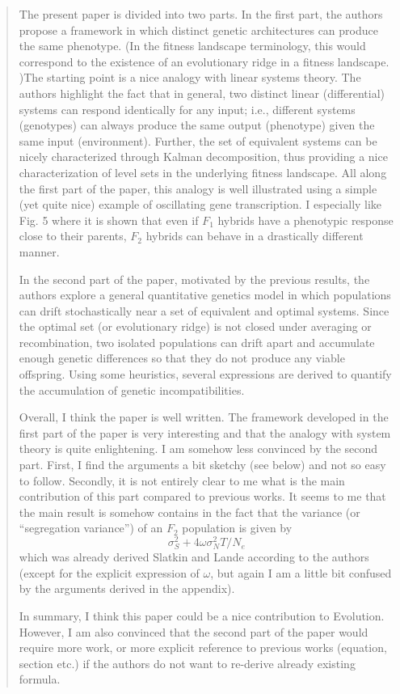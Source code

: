 


\begin{quote}
The present paper is divided into two parts. In the first part, the authors propose a framework
in which distinct genetic architectures can produce the same phenotype. (In the fitness landscape
terminology, this would correspond to the existence of an evolutionary ridge in a fitness landscape.
)The starting point is a nice analogy with linear systems theory. The authors highlight the fact
that in general, two distinct linear (differential) systems can respond identically for any input; i.e.,
different systems (genotypes) can always produce the same output (phenotype) given the same input
(environment). Further, the set of equivalent systems can be nicely characterized through Kalman
decomposition, thus providing a nice characterization of level sets in the underlying fitness landscape.
All along the first part of the paper, this analogy is well illustrated using a simple (yet quite nice)
example of oscillating gene transcription. I especially like Fig. 5 where it is shown that even if $F_1$
hybrids have a phenotypic response close to their parents, $F_2$ hybrids can behave in a drastically
different manner.

In the second part of the paper, motivated by the previous results, the authors explore a general
quantitative genetics model in which populations can drift stochastically near a set of equivalent
and optimal systems. Since the optimal set (or evolutionary ridge) is not closed under averaging or
recombination, two isolated populations can drift apart and accumulate enough genetic differences
so that they do not produce any viable offspring. Using some heuristics, several expressions are
derived to quantify the accumulation of genetic incompatibilities.

Overall, I think the paper is well written. The framework developed in the first part of the paper
is very interesting and that the analogy with system theory is quite enlightening. I am somehow
less convinced by the second part. First, I find the arguments a bit sketchy (see below) and not so
easy to follow. Secondly, it is not entirely clear to me what is the main contribution of this part
compared to previous works. It seems to me that the main result is somehow contains in the fact
that the variance (or ``segregation variance'') of an $F_2$ population is given by
$$\sigma^2_S + 4 \omega \sigma^2_N T / N_e$$
which was already derived Slatkin and Lande according to the authors (except for the explicit
expression of $\omega$, but again I am a little bit confused by the arguments derived in the appendix).

In summary, I think this paper could be a nice contribution to Evolution. However, I am also
convinced that the second part of the paper would require more work, or more explicit reference
to previous works (equation, section etc.) if the authors do not want to re-derive already existing
formula.
\end{quote}


